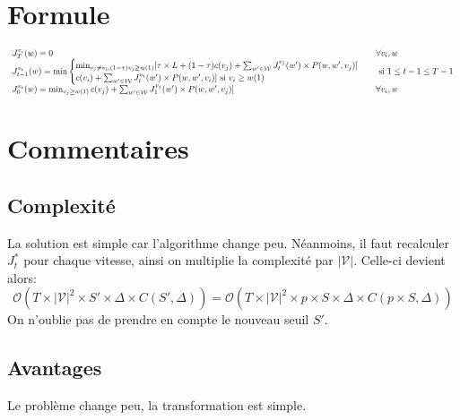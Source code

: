 \documentclass[10pt,a4paper]{article}
\newcommand{\V}{\mathcal{V}}
\begin{document}
\section{Formule}


\begin{equation}
  \resizebox{1.3\hsize}{!}{$
    \begin{array}{ll}
      J_T^{v_i}(w)=0 & \forall v_i, w\\
      J_{t-1}^{v_i}(w) = \min
      \begin{cases} 
        \min_{v_j\neq v_i, (1-\tau)v_j\geq w(1)} [\tau
        \times L+(1-\tau)c(v_j)+\sum_{w'\in\mathcal{W}}J_t^{v_j}(w')\times
        P(w,w',v_j)]\\
        c(v_i)+\sum_{w'\in\mathcal{W}}J_t^{v_i}(w')\times P(w,w',v_i)]
        \text{ si } v_i\geq w(1)

      \end{cases} & \text{ si } 1\leq t-1 \leq T-1 \\
      
      J_0^{v_i}(w) = \min_{v_j\geq
      w(1)}c(v_j)+\sum_{w'\in\mathcal{W}}J_1^{v_j}(w')\times
      P(w,w',v_j)] & \forall v_i,w 

    \end{array}
  $}
\end{equation}

\section{Commentaires}

\subsection{Complexité}

La solution est simple car l'algorithme change peu. Néanmoins, il faut
recalculer $J_t^*$ pour chaque vitesse, ainsi on multiplie la
complexité par $|\V|$. Celle-ci devient alors: \[\mathcal{O}(T\times|\mathcal{V}|^2 \times
S'\times\Delta\times C(S',\Delta))=\mathcal{O}(T\times|\mathcal{V}|^2
\times p\times S\times\Delta\times C(p\times S,\Delta))\]
On n'oublie pas de prendre en compte le nouveau seuil $S'$.

\subsection{Avantages}

Le problème change peu, la transformation est simple.
\end{document}
